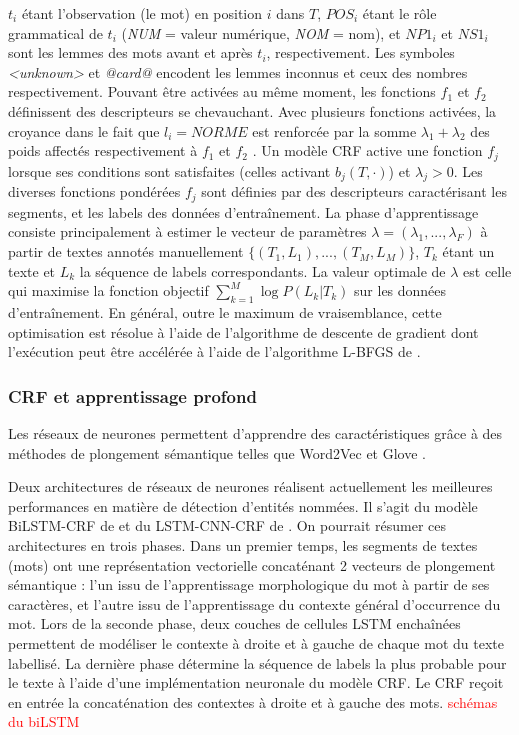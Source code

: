 $t_i$ étant l'observation (le mot) en position $i$ dans $T$, $POS_i$ étant le rôle grammatical de $t_i$ (\textit{NUM} = valeur numérique, \textit{NOM} = nom), et $NP1_i$ et $NS1_i$ sont les lemmes des mots avant et après $t_i$, respectivement. Les symboles \textit{<unknown>} et \textit{@card@} encodent les lemmes inconnus et ceux des nombres respectivement. Pouvant être activées au même moment, les fonctions $f_1$ et $f_2$ définissent des descripteurs se chevauchant. Avec plusieurs fonctions activées, la croyance dans le fait que $l_i = NORME$ est renforcée par la somme $\lambda_1 + \lambda_2$ des poids affectés respectivement à $f_1$ et $f_2$ \citep{Zhu2010CRFlecture}.  Un modèle CRF active une fonction $f_j$ lorsque ses conditions sont satisfaites (celles activant $b_j(T,\cdot)$) et $\lambda_j > 0$. Les diverses fonctions pondérées $f_j$ sont définies par des descripteurs caractérisant les segments, et les labels des données d'entraînement. La phase d'apprentissage consiste principalement à estimer le vecteur de paramètres $\lambda = (\lambda_1,...,\lambda_F)$ à partir de textes annotés manuellement $ \lbrace (T_1, L_1), ..., (T_M, L_M) \rbrace $, $ T_k $ étant un texte et $ L_k $ la séquence de labels correspondants. La valeur optimale de $\lambda$ est celle qui maximise la fonction objectif   
$\sum\limits_ {k = 1} ^ M \log P (L_k \vert T_k) $ sur les données d'entraînement. En général, outre le maximum de vraisemblance, cette optimisation est résolue à l'aide de l'algorithme de descente de gradient dont l'exécution peut être accélérée à l'aide de l'algorithme L-BFGS de \citet{liu1989l-bfgs}.

\subsubsection{CRF et apprentissage profond}
Les réseaux de neurones permettent d'apprendre des caractéristiques  grâce à des méthodes de plongement sémantique telles que Word2Vec \citep{lemikolov2014word2vec} et Glove \citep{pennington2014glove}.  


Deux architectures de réseaux de neurones réalisent actuellement les meilleures performances en matière de détection d'entités nommées. Il s'agit du modèle BiLSTM-CRF de  \citet{lample2016nnner} et du LSTM-CNN-CRF de \citet{ma2016lstm-cnns-crf}. On pourrait résumer ces architectures en trois phases. Dans un premier temps, les segments de textes (mots) ont une représentation vectorielle concaténant 2 vecteurs de plongement sémantique : l'un issu de l'apprentissage morphologique du mot à partir de ses caractères, et l'autre issu de l'apprentissage du contexte général d'occurrence du mot. Lors de la seconde phase, deux couches de cellules LSTM enchaînées permettent de modéliser le contexte à droite et à gauche de chaque mot du texte labellisé. La dernière phase détermine la séquence de labels la plus probable pour le texte à l'aide d'une implémentation neuronale du modèle CRF. Le CRF reçoit en entrée la concaténation des contextes à droite et à gauche des mots. \textcolor{red}{schémas du biLSTM}


